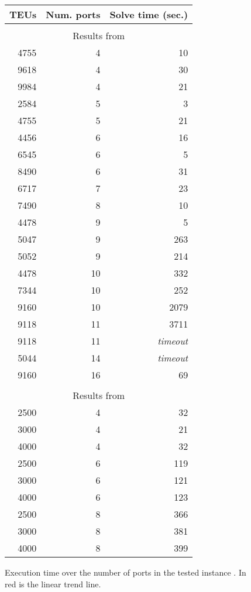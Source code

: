 \documentclass[preprint,12pt,authoryear]{elsarticle}
\begin{document}
\begin{figure}[htp]
    \footnotesize
    \centering \begin{tabular}{rrr}
        TEUs	&	Num. ports	&	Solve time (sec.)	\\\hline\\
       \multicolumn{3}{c}{Results from \cite{Pacino2011FastVessels}}\\\hline
       4755	&	4	&	10	\\
       9618	&	4	&	30	\\
       9984	&	4	&	21	\\
       2584	&	5	&	3	\\
       4755	&	5	&	21	\\
       4456	&	6	&	16	\\
       6545	&	6	&	5	\\
       8490	&	6	&	31	\\
       6717	&	7	&	23	\\
       7490	&	8	&	10	\\
       4478	&	9	&	5	\\
       5047	&	9	&	263	\\
       5052	&	9	&	214	\\
       4478	&	10	&	332	\\
       7344	&	10	&	252	\\
       9160	&	10	&	2079	\\
       9118	&	11	&	3711	\\
       9118	&	11	&	{\em timeout}	\\
       5044	&	14	&	{\em timeout}	\\
       9160	&	16	&	69	\\\hline\\
       \multicolumn{3}{c}{Results from \cite{Kang2002StowageTransportation}}\\\hline
       2500	&	4	&	32	\\
       3000	&	4	&	21	\\
       4000	&	4	&	32	\\
       2500	&	6	&	119	\\
       3000	&	6	&	121	\\
       4000	&	6	&	123	\\
       2500	&	8	&	366	\\
       3000	&	8	&	381	\\
       4000	&	8	&	399	\\\hline
   \end{tabular}
    \caption{Execution time over the number of ports in the tested instance \citep{Pacino2011FastVessels,Kang2002StowageTransportation}. In red is the linear trend line.}
    \label{fig:plot_multi_port_time}
\end{figure}
\end{document}
